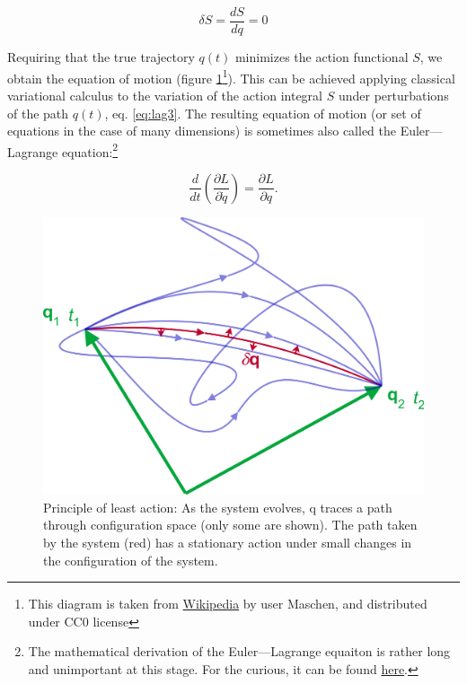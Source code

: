 \documentclass[
  9pt,
]{extbook}
\theoremstyle{definition}
\theoremstyle{definition}
\theoremstyle{definition}
\theoremstyle{remark}
\begin{document}
\begin{equation}
\delta S = \frac{dS}{dq}= 0
\label{eq:lag3}
\end{equation}

Requiring that the true trajectory \(q(t)\) minimizes the action functional \(S\), we obtain the equation of motion (figure \ref{fig:Fig1c2}\footnote{This diagram is taken from \href{https://en.wikipedia.org}{Wikipedia} by user Maschen, and distributed under CC0 license}). This can be achieved applying classical variational calculus to the variation of the action integral \(S\) under perturbations of the path \(q(t)\), eq. \eqref{eq:lag3}. The resulting equation of motion (or set of equations in the case of many dimensions) is sometimes also called the Euler---Lagrange equation:\footnote{The mathematical derivation of the Euler---Lagrange equaiton is rather long and unimportant at this stage. For the curious, it can be found \href{https://en.wikipedia.org/wiki/Euler–Lagrange_equation}{here}.}

\begin{equation}
\frac{d}{dt}\left(\frac{\partial L}{\partial\dot q}\right)=\frac{\partial L}{\partial q}.
\label{eq:lag4}
\end{equation}

\begin{figure}

{\centering \includegraphics[width=0.7\linewidth]{./img/OEP_wiki1} 

}

\caption{Principle of least action: As the system evolves, q traces a path through configuration space (only some are shown). The path taken by the system (red) has a stationary action under small changes in the configuration of the system.}\label{fig:Fig1c2}
\end{figure}
\end{document}
